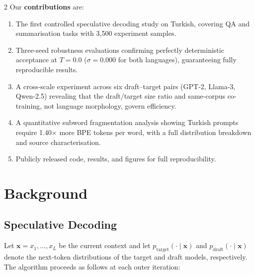 \documentclass[11pt,a4paper]{article}
\begin{document}
\begin{multicols}{2}
Our \textbf{contributions} are:
\begin{enumerate}[leftmargin=*,itemsep=2pt]
  \item The first controlled speculative decoding study on Turkish, covering
        QA and summarisation tasks with 3{,}500 experiment samples.
  \item Three-seed robustness evaluations confirming perfectly deterministic
        acceptance at $T=0.0$ ($\sigma\!=\!0.000$ for both languages),
        guaranteeing fully reproducible results.
  \item A cross-scale experiment across six draft--target pairs (GPT-2,
        Llama-3, Qwen-2.5) revealing that the draft/target size ratio
        and same-corpus co-training, not language morphology, govern
        efficiency.
  \item A quantitative subword fragmentation analysis showing Turkish
        prompts require 1.40$\times$ more BPE tokens per word, with a
        full distribution breakdown and source characterisation.
  \item Publicly released code, results, and figures for full
        reproducibility.
\end{enumerate}

\section{Background}
\label{sec:background}

\subsection{Speculative Decoding}

Let $\mathbf{x} = x_1, \ldots, x_L$ be the current context and let
$p_{\mathrm{target}}(\cdot \mid \mathbf{x})$ and
$p_{\mathrm{draft}}(\cdot \mid \mathbf{x})$ denote the next-token
distributions of the target and draft models, respectively.
The algorithm \citep{leviathan2023fast} proceeds as follows at each
outer iteration:


\end{multicols}
\end{document}

